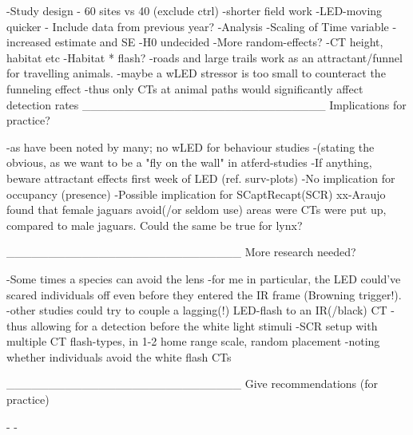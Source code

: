 -Study design
	- 60 sites vs 40 (exclude ctrl)
	   -shorter field work
	   -LED-moving quicker
	- Include data from previous year?
-Analysis
   -Scaling of Time variable
	-increased estimate and SE
	-H0 undecided
   -More random-effects?
	-CT height, habitat etc
   -Habitat * flash?
	 -roads and large trails work as an attractant/funnel for travelling animals. 
	   -maybe a wLED stressor is too small to counteract the funneling effect
		-thus only CTs at animal paths would significantly affect detection rates
_____________________________
Implications for practice?

-as have been noted by many; no wLED for behaviour studies
	-(stating the obvious, as we want to be a "fly on the wall" in atferd-studies
-If anything, beware attractant effects first week of LED (ref. surv-plots)
-No implication for occupancy (presence\absence)
-Possible implication for SCaptRecapt(SCR)
	xx-Araujo found that female jaguars avoid(/or seldom use) areas were CTs were put up, compared to male jaguars. Could the same be true for lynx? 


____________________________
More research needed?

-Some times a species can avoid the lens
  -for me in particular, the LED could've scared individuals off even before they entered the IR frame (Browning trigger!).
     -other studies could try to couple a lagging(!) LED-flash to an IR(/black) CT
	-thus allowing for a detection before the white light stimuli
-SCR setup with multiple CT flash-types, in 1-2 home range scale, random placement
	-noting whether individuals avoid the white flash CTs


____________________________
Give recommendations (for practice)

-
-